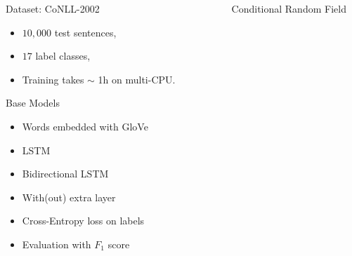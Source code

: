 \documentclass[final]{beamer}
\newlength{\sepwid}
\newlength{\onecolwid}
\newlength{\twocolwid}
\begin{document}
\begin{frame}[t]
\begin{columns}[t]
\begin{column}{\onecolwid}
\begin{block}{Dataset: CoNLL-2002}
\begin{itemize}
  \item $10,000$ test sentences,

  \item $17$ label classes,

  \item Training takes $\sim$ 1h on multi-CPU.
\end{itemize}
\end{block}

\begin{block}{Base Models}

\begin{itemize}
  \item Words embedded with GloVe

  \item LSTM

  \item Bidirectional LSTM

  \item With(out) extra layer

  \item Cross-Entropy loss on labels

  \item Evaluation with $F_1$ score
\end{itemize}

\end{block}

\end{column} %




\begin{column}{\sepwid}\end{column} %

\begin{column}{\twocolwid} %

\begin{columns}[t,totalwidth=\twocolwid] %

\begin{column}{\onecolwid}\vspace{-.6in} %


\begin{block}{Conditional Random Field}


\end{block}
\end{column}
\end{columns}
\end{column}
\end{columns}
\end{frame}
\end{document}
